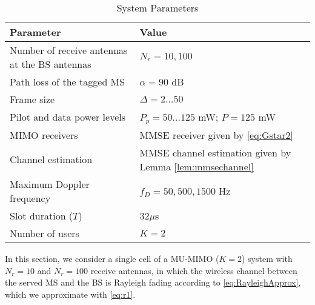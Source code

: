 \documentclass[conference, a4paper, 10pt]{IEEEtran}
\newcommand{\mx}[1]{\mathbf{#1}}
\begin{document}
\begin{table}[ht]
\caption{System Parameters}
\vspace{1mm}
\label{tab:params}
\footnotesize
\begin{tabularx}{\columnwidth}{|X|X|}
		\hline
		\hline
		\textbf{Parameter}                     & \textbf{Value} \\
		\hline
		\hline
		Number of receive antennas at the \ac{BS} antennas  & $N_r=10, 100$  \\ \hline
		Path loss of the tagged MS               & $\alpha=90$ dB \\ \hline
        Frame size                              & $\Delta=2 \dots 50$ \\ \hline
		Pilot and data power levels             & $P_p=50...125$ mW; $P=125$ mW \\ \hline
        MIMO receivers                         & MMSE receiver given by \eqref{eq:Gstar2} \\ \hline
        Channel estimation                      & MMSE channel estimation given by Lemma \ref{lem:mmsechannel} \\ \hline
        Maximum Doppler frequency               & $f_D=50, 500, 1500$ Hz \\ \hline
        Slot duration ($T$)                     & $32\mu$s \\ \hline
        Number of users                         & $K=2$ \\ \hline
		\hline
\end{tabularx}
\end{table}

In this section, we consider a single cell of a \ac{MU-MIMO} ($K=2$) system with $N_r=10$ and $N_r=100$ receive antennas,
in which the wireless channel between the served \ac{MS} and the \ac{BS} is Rayleigh fading according to \eqref{eq:RayleighApprox}, which we approximate with \eqref{eq:r1}.
\end{document}
